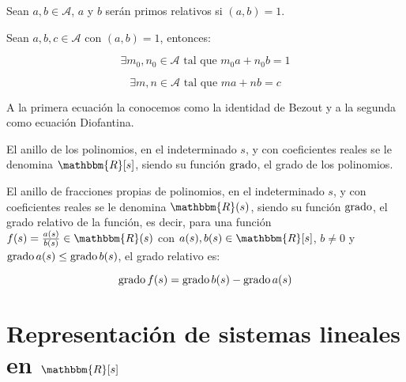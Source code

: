         \begin{definicion}
            Sean $a, b \in \mathcal{A}$, $a$ y $b$ serán primos relativos si $(a, b) = 1$.
        \end{definicion}

        \begin{lema}
            Sean $a, b, c \in \mathcal{A}$ con $(a, b) = 1$, entonces:

            \begin{equation}
                \exists m_0, n_0 \in \mathcal{A} \text{ tal que } m_0 a + n_0 b = 1
            \end{equation}

            \begin{equation}  \label{eq:anillos0}
                \exists m, n \in \mathcal{A} \text{ tal que } m a + n b = c
            \end{equation}

            A la primera ecuación la conocemos como la identidad de Bezout y a la segunda como ecuación Diofantina.
        \end{lema}

        \begin{definicion}
            El anillo de los polinomios, en el indeterminado $s$, y con coeficientes reales se le denomina $\mathbbm{R}[s]$, siendo su función $\operatorname{grado}$, el grado de los polinomios.

            El anillo de fracciones propias de polinomios, en el indeterminado $s$, y con coeficientes reales se le denomina $\mathbbm{R}(s)$, siendo su función $\operatorname{grado}$, el grado relativo de la función, es decir, para una función $f(s) = \frac{a(s)}{b(s)} \in \mathbbm{R}(s)$ con $a(s), b(s) \in \mathbbm{R}[s]$, $b \ne 0$ y $\operatorname{grado}{a(s)} \le \operatorname{grado}{b(s)}$, el grado relativo es:

            \begin{equation*}
                \operatorname{grado}{f(s)} = \operatorname{grado}{b(s)} - \operatorname{grado}{a(s)}
            \end{equation*}
        \end{definicion}


    \newpage
    \section{Representación de sistemas lineales en $\mathbbm{R}[s]$}

